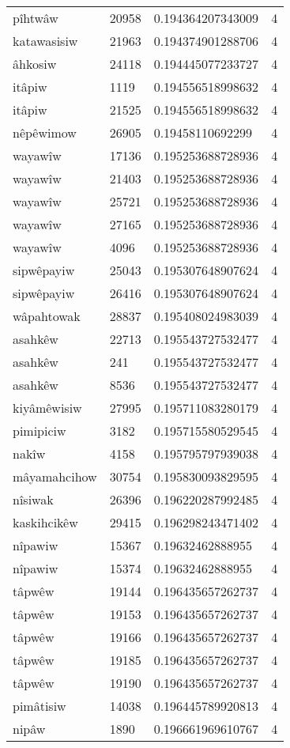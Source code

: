 \begin{longtable}{llll}
pîhtwâw & 20958 & 0.194364207343009 & 4 \\
katawasisiw & 21963 & 0.194374901288706 & 4 \\
âhkosiw & 24118 & 0.194445077233727 & 4 \\
itâpiw & 1119 & 0.194556518998632 & 4 \\
itâpiw & 21525 & 0.194556518998632 & 4 \\
nêpêwimow & 26905 & 0.19458110692299 & 4 \\
wayawîw & 17136 & 0.195253688728936 & 4 \\
wayawîw & 21403 & 0.195253688728936 & 4 \\
wayawîw & 25721 & 0.195253688728936 & 4 \\
wayawîw & 27165 & 0.195253688728936 & 4 \\
wayawîw & 4096 & 0.195253688728936 & 4 \\
sipwêpayiw & 25043 & 0.195307648907624 & 4 \\
sipwêpayiw & 26416 & 0.195307648907624 & 4 \\
wâpahtowak & 28837 & 0.195408024983039 & 4 \\
asahkêw & 22713 & 0.195543727532477 & 4 \\
asahkêw & 241 & 0.195543727532477 & 4 \\
asahkêw & 8536 & 0.195543727532477 & 4 \\
kiyâmêwisiw & 27995 & 0.195711083280179 & 4 \\
pimipiciw & 3182 & 0.195715580529545 & 4 \\
nakîw & 4158 & 0.195795797939038 & 4 \\
mâyamahcihow & 30754 & 0.195830093829595 & 4 \\
nîsiwak & 26396 & 0.196220287992485 & 4 \\
kaskihcikêw & 29415 & 0.196298243471402 & 4 \\
nîpawiw & 15367 & 0.19632462888955 & 4 \\
nîpawiw & 15374 & 0.19632462888955 & 4 \\
tâpwêw & 19144 & 0.196435657262737 & 4 \\
tâpwêw & 19153 & 0.196435657262737 & 4 \\
tâpwêw & 19166 & 0.196435657262737 & 4 \\
tâpwêw & 19185 & 0.196435657262737 & 4 \\
tâpwêw & 19190 & 0.196435657262737 & 4 \\
pimâtisiw & 14038 & 0.196445789920813 & 4 \\
nipâw & 1890 & 0.196661969610767 & 4 \\

\end{longtable}
